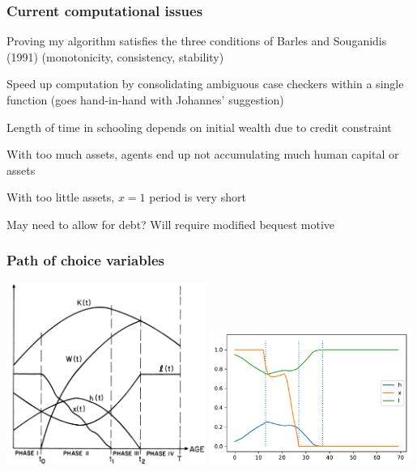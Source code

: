 \documentclass[aspectratio=169]{beamer}
\newenvironment{wideitemize}{\itemize\addtolength{\itemsep}{10pt}}{\enditemize}
\begin{document}
\begin{frame}
    \frametitle{Current computational issues}

    \begin{wideitemize}
        \item Proving my algorithm satisfies the three conditions of Barles and Souganidis (1991) (monotonicity, consistency, stability)
        \item Speed up computation by consolidating ambiguous case checkers within a single function (goes hand-in-hand with Johannes' suggestion)
        \item Length of time in schooling depends on initial wealth due to credit constraint
        \begin{wideitemize}
            \item With too much assets, agents end up not accumulating much human capital or assets
            \item With too little assets, $x = 1$ period is very short
            \item May need to allow for debt? Will require modified bequest motive
        \end{wideitemize}
    \end{wideitemize}

\end{frame}

\begin{frame}
    \frametitle{Path of choice variables}
    
        \includegraphics[width=0.49\textwidth]{../output/phases.png}
        \includegraphics[width=0.49\textwidth]{../output/fd_hjb_choice_path.pdf}

\end{frame}
\end{document}
